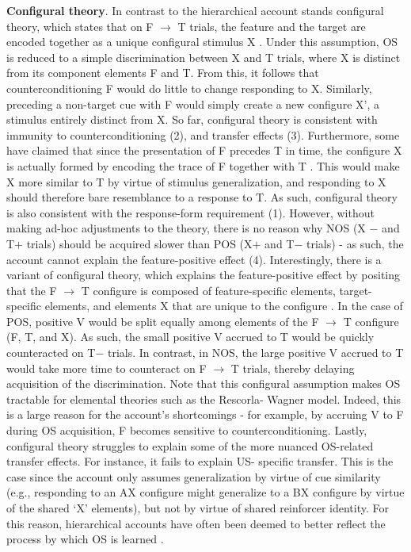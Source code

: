 \documentclass[11pt]{article}
\let\cite=\citep
\begin{document}
{\bf Configural theory}. In contrast to the hierarchical account stands 
configural theory, which states that on F $\rightarrow$ T trials, the feature 
and the target are encoded together as a unique configural stimulus X 
\cite{Pearce1987,Pearce1994}. Under this assumption, OS is reduced to a simple 
discrimination between X and T trials, where X is distinct from its component 
elements F and T. From this, it follows that counterconditioning F would do 
little to change responding to X. Similarly, preceding a non-target cue with F 
would simply create a new configure X', a stimulus entirely distinct from X. So 
far, configural theory is consistent with immunity to counterconditioning (2), 
and transfer effects (3). Furthermore, some have claimed that since the 
presentation of F precedes T in time, the configure X is actually formed by 
encoding the trace of F together with T \cite{Holland1992}. This would make X 
more similar to T by virtue of stimulus generalization, and responding to X 
should therefore bare resemblance to a response to T. As such, configural 
theory is also consistent with the response-form requirement (1). However, 
without making ad-hoc adjustments to the theory, there is no reason why NOS (X
$-$ and T$+$ trials) should be acquired slower than POS (X$+$ and T$-$ trials) 
- as such, the account cannot explain the feature-positive effect (4). 
Interestingly, there is a variant of configural theory, which explains the 
feature-positive effect by positing that the F $\rightarrow$ T configure is 
composed of feature-specific elements, target-specific elements, and elements X 
that are unique to the configure \cite{Rescorla1973}. In the case 
of POS, positive V would be split equally among elements of the F $\rightarrow$ 
T configure (F, T, and X). As such, the small positive V accrued to T would be 
quickly counteracted on T$-$ trials. In contrast, in NOS, the large positive V 
accrued to T would take more time to counteract on F $\rightarrow$ T trials, 
thereby delaying acquisition of the discrimination. Note that this configural 
assumption makes OS tractable for elemental theories such as the Rescorla-
Wagner model. Indeed, this is a large reason for the account's shortcomings - 
for example, by accruing V to F during OS acquisition, F becomes sensitive to 
counterconditioning. Lastly, configural theory struggles to explain some of the 
more nuanced OS-related transfer effects. For instance, it fails to explain US-
specific transfer. This is the case since the account only assumes 
generalization by virtue of cue similarity (e.g., responding to an AX configure 
might generalize to a BX configure by virtue of the shared `X' elements), but 
not by virtue of shared reinforcer identity. For this reason, hierarchical 
accounts have often been deemed to better reflect the process by which OS is 
learned \cite{Holland1992,Bonardi2017}.
\end{document}
